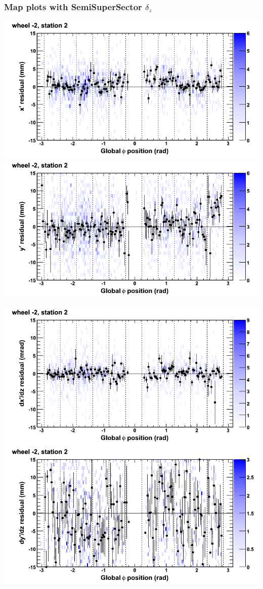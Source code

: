 \documentclass[compress]{beamer}
\begin{document}
\begin{frame}
\frametitle{Map plots with SemiSuperSector $\delta_z$}
\includegraphics[width=0.5\linewidth]{zfit_mapplots/DTvsphi_st2whA_x.png}
\includegraphics[width=0.5\linewidth]{zfit_mapplots/DTvsphi_st2whA_y.png}

\includegraphics[width=0.5\linewidth]{zfit_mapplots/DTvsphi_st2whA_dxdz.png}
\includegraphics[width=0.5\linewidth]{zfit_mapplots/DTvsphi_st2whA_dydz.png}
\end{frame}
\end{document}

